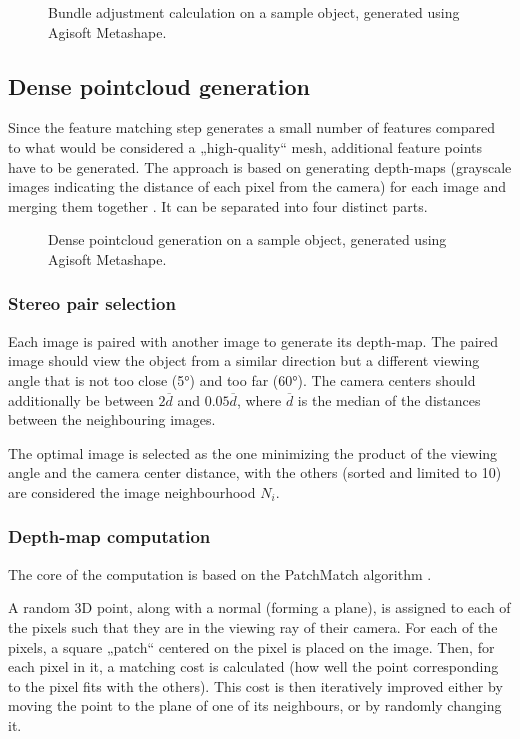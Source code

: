 \begin{figure}
	\centering
	\caption{Bundle adjustment calculation on a sample object, generated using Agisoft Metashape.}%
\end{figure}

\subsection{Dense pointcloud generation}
Since the feature matching step generates a small number of features compared to what would be considered a „high-quality“ mesh, additional feature points have to be generated.
The approach is based on generating depth-maps (grayscale images indicating the distance of each pixel from the camera) for each image and merging them together \cite{shen2013accurate}.
It can be separated into four distinct parts.

\begin{figure}[t]
	\centering
	\caption{Dense pointcloud generation on a sample object, generated using Agisoft Metashape.}%
\end{figure}

\subsubsection{Stereo pair selection}
Each image is paired with another image to generate its depth-map.
The paired image should view the object from a similar direction but a different viewing angle that is not too close (\ang{5}) and too far (\ang{60}).
The camera centers should additionally be between $2 \overline{d}$ and $0.05 \overline{d}$, where $\overline{d}$ is the median of the distances between the neighbouring images.

The optimal image is selected as the one minimizing the product of the viewing angle and the camera center distance, with the others (sorted and limited to 10) are considered the image neighbourhood $N_i$.

\subsubsection{Depth-map computation}
The core of the computation is based on the PatchMatch algorithm \cite{barnes2009PAR}.

A random 3D point, along with a normal (forming a plane), is assigned to each of the pixels such that they are in the viewing ray of their camera.
For each of the pixels, a square „patch“ centered on the pixel is placed on the image.
Then, for each pixel in it, a matching cost is calculated (how well the point corresponding to the pixel fits with the others).
This cost is then iteratively improved either by moving the point to the plane of one of its neighbours, or by randomly changing it.

